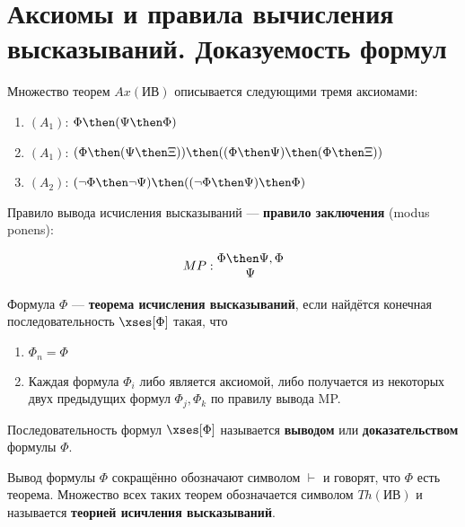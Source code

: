 \section{Аксиомы и правила вычисления высказываний. Доказуемость формул}
Множество теорем $Ax(\text{ИВ})$ описывается следующими тремя аксиомами:

\begin{enumerate}
    \item $(A_1)$: $\Phi \then (\Psi \then \Phi)$
    \item $(A_1)$: $(\Phi \then (\Psi \then \Xi)) \then ((\Phi \then \Psi) \then (\Phi \then \Xi))$
    \item $(A_2)$: $(\lnot \Phi \then \lnot \Psi) \then ((\lnot \Phi \then \Psi) \then \Phi)$
\end{enumerate}

\dftion Правило вывода исчисления высказываний --- \textbf{правило заключения} (modus ponens):

$$
MP: \begin{matrix}
    \Phi \then \Psi, \Phi \\
    \Psi
\end{matrix}
$$

\dftion Формула $\Phi$ --- \textbf{теорема исчисления высказываний}, если найдётся конечная последовательность $\xses[\Phi]$ такая, что

\begin{enumerate}
    \item $\Phi_n = \Phi$
    \item Каждая формула $\Phi_i$ либо является аксиомой, либо получается из некоторых двух предыдущих формул $\Phi_j, \Phi_k$ по правилу вывода MP.
\end{enumerate}

Последовательность формул $\xses[\Phi]$ называется \textbf{выводом} или \textbf{доказательством} формулы $\Phi$.

\dftion Вывод формулы $\Phi$ сокращённо обозначают символом $\vdash$ и говорят, что $\Phi$ есть теорема. Множество всех таких теорем обозначается символом $Th(\text{ИВ})$ и называется \textbf{теорией исичления высказываний}.